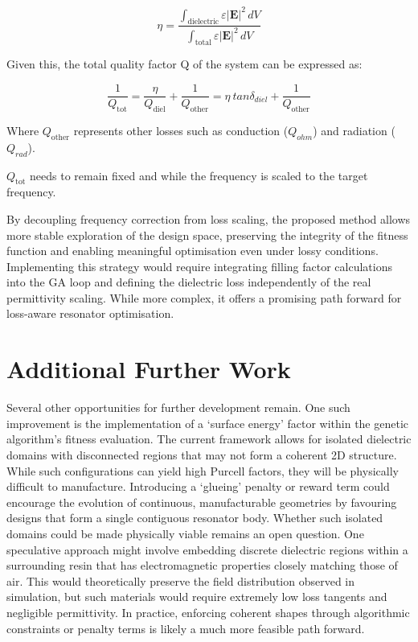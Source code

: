 \begin{equation}
  \eta = \frac{\int_{\text{dielectric}} \varepsilon |\mathbf{E}|^2 \, dV}
              {\int_{\text{total}} \varepsilon |\mathbf{E}|^2 \, dV}
\end{equation}

Given this, the total quality factor Q of the system can be expressed as:

\begin{equation}
  \frac{1}{Q_{\text{tot}}} =
    \frac{\eta}{Q_\text{diel}} + \frac{1}{Q_{\text{other}}}
    = \eta~tan\delta_{diel}+ \frac{1}{Q_{\text{other}}}
\end{equation}

Where $Q_{\text{other}}$ represents other losses such as conduction ($Q_{ohm}$)
and radiation ($Q_{rad}$).

$Q_{\text{tot}}$ needs to remain fixed and while the frequency is scaled to the
target frequency.

By decoupling frequency correction from loss scaling, the proposed method allows
more stable exploration of the design space, preserving the integrity of the
fitness function and enabling meaningful optimisation even under lossy
conditions. Implementing this strategy would require integrating filling factor
calculations into the GA loop and defining the dielectric loss independently of
the real permittivity scaling. While more complex, it offers a promising path
forward for loss-aware resonator optimisation.

\section{Additional Further Work}
\label{sec:section19}
Several other opportunities for further development remain. One such improvement
is the implementation of a ‘surface energy’ factor within the genetic
algorithm’s fitness evaluation. The current framework allows for isolated
dielectric domains with disconnected regions that may not form a coherent 2D
structure. While such configurations can yield high Purcell factors, they will
be physically difficult to manufacture. Introducing a ‘glueing’ penalty or
reward term could encourage the evolution of continuous, manufacturable
geometries by favouring designs that form a single contiguous resonator body.
Whether such isolated domains could be made physically viable remains an open
question. One speculative approach might involve embedding discrete dielectric
regions within a surrounding resin that has electromagnetic properties closely
matching those of air. This would theoretically preserve the field distribution
observed in simulation, but such materials would require extremely low loss
tangents and negligible permittivity. In practice, enforcing coherent shapes
through algorithmic constraints or penalty terms is likely a much more feasible
path forward.

